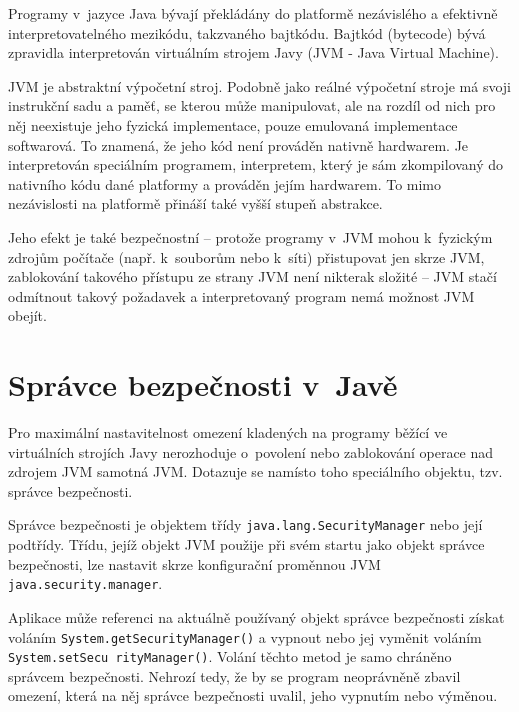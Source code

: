 Programy v~jazyce Java bývají překládány do platformě nezávislého a efektivně interpretovatelného mezikódu, takzvaného bajtkódu.
Bajtkód (bytecode) bývá zpravidla interpretován virtuálním strojem Javy (JVM - Java Virtual Machine).
\cite{jvmIntro}

JVM je abstraktní výpočetní stroj. Podobně jako reálné výpočetní stroje má svoji instrukční sadu a paměť, se kterou může manipulovat, ale na rozdíl od nich pro něj neexistuje jeho fyzická implementace, pouze emulovaná implementace softwarová.
To znamená, že jeho kód není prováděn nativně hardwarem. Je interpretován speciálním programem, interpretem, který je sám zkompilovaný do nativního kódu dané platformy a prováděn jejím hardwarem.
To mimo nezávislosti na platformě přináší také vyšší stupeň abstrakce.
\cite{jvmIntro}

Jeho efekt je také bezpečnostní -- protože programy v~JVM mohou k~fyzickým zdrojům počítače (např. k~souborům nebo k~síti) přistupovat jen skrze JVM, zablokování takového přístupu ze strany JVM není nikterak složité -- JVM stačí odmítnout takový požadavek a interpretovaný program nemá možnost JVM obejít.

\section{Správce bezpečnosti v~Javě} \label{securityManager}

Pro maximální nastavitelnost omezení kladených na programy běžící ve virtuálních strojích Javy nerozhoduje o~povolení nebo zablokování operace nad zdrojem JVM samotná JVM. Dotazuje se namísto toho speciálního objektu, tzv. správce bezpečnosti.~\cite{tutorialsTSM}

Správce bezpečnosti je objektem třídy {\tt java.lang.SecurityManager} nebo její podtřídy.
Třídu, jejíž objekt JVM použije při svém startu jako objekt správce bezpečnosti, lze nastavit skrze konfigurační proměnnou JVM {\tt java.security.manager}.~\cite{javaSecurityArch}

Aplikace může referenci na aktuálně používaný objekt správce bezpečnosti získat voláním {\tt System.getSecurityManager()} a vypnout nebo jej vyměnit voláním {\tt System.setSecu rityManager()}. Volání těchto metod je samo chráněno správcem bezpečnosti.
Nehrozí tedy, že by se program neoprávněně zbavil omezení, která na něj správce bezpečnosti uvalil, jeho vypnutím nebo výměnou.
\cite{tutorialsTSM}


